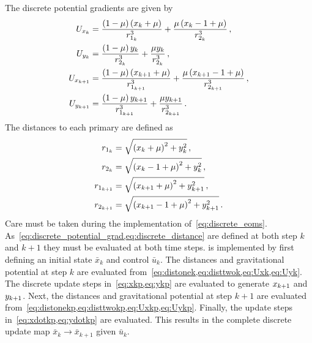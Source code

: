 \documentclass[letterpaper, paper,11pt]{AAS}		%
\begin{document}
The discrete potential gradients are given by
\begin{subequations}\label{eq:discrete_potential_grad}
\begin{align}
	U_{\xk} &= \frac{\parenth{1 -\mu} \parenth{\xk + \mu}}{\distonek^3} + \frac{ \mu \parenth{\xk -1 + \mu}}{\disttwok^3} \label{eq:Uxk} \, ,\\
	U_{\yk} &= \frac{\parenth{1 -\mu} \yk}{\disttwok^3} + \frac{ \mu \yk}{\disttwok^3} \label{eq:Uyk} \, ,\\
	U_{\xkp} &= \frac{\parenth{1 -\mu} \parenth{\xkp + \mu}}{\distonekp^3} + \frac{ \mu \parenth{\xkp -1 + \mu}}{\disttwokp^3} \label{eq:Uxkp}\, ,\\
	U_{\ykp} &= \frac{\parenth{1 -\mu} \ykp}{\distonekp^3} + \frac{ \mu \ykp}{\disttwokp^3} \label{eq:Uykp} \, .
\end{align}	
\end{subequations}
The distances to each primary are defined as
\begin{subequations}\label{eq:discrete_distance}
\begin{align}
	\distonek &= \sqrt{\left( \xk + \mu\right)^2 + \yk^2} \label{eq:distonek}\, ,\\
	\disttwok &= \sqrt{\left( \xk - 1 + \mu\right)^2 + \yk^2} \label{eq:disttwok}\, ,\\
	\distonekp &= \sqrt{\left( \xkp + \mu\right)^2 + \ykp^2} \label{eq:distonekp}\, ,\\
	\disttwokp &= \sqrt{\left( \xkp - 1 + \mu\right)^2 + \ykp^2} \label{eq:disttwokp} \, .
\end{align}
\end{subequations}
Care must be taken during the implementation of~\cref{eq:discrete_eoms}.
As~\cref{eq:discrete_potential_grad,eq:discrete_distance} are defined at both step \( k \) and \( k+1 \) they must be evaluated at both time steps.
 is implemented by first defining an initial state \( \bar{x}_k \) and control \( \bar{u}_k \).
The distances and gravitational potential at step \( k \) are evaluated from~\cref{eq:distonek,eq:disttwok,eq:Uxk,eq:Uyk}.
The discrete update steps in~\cref{eq:xkp,eq:ykp} are evaluated to generate \( x_{k+1} \) and \( y_{k+1}\).
Next, the distances and gravitational potential at step \( k+1 \) are evaluated from~\cref{eq:distonekp,eq:disttwokp,eq:Uxkp,eq:Uykp}. 
Finally, the update steps in~\cref{eq:xdotkp,eq:ydotkp} are evaluated.
This results in the complete discrete update map \( \bar{x}_k \to \bar{x}_{k+1} \) given \( \bar{u}_k \).
\end{document}
